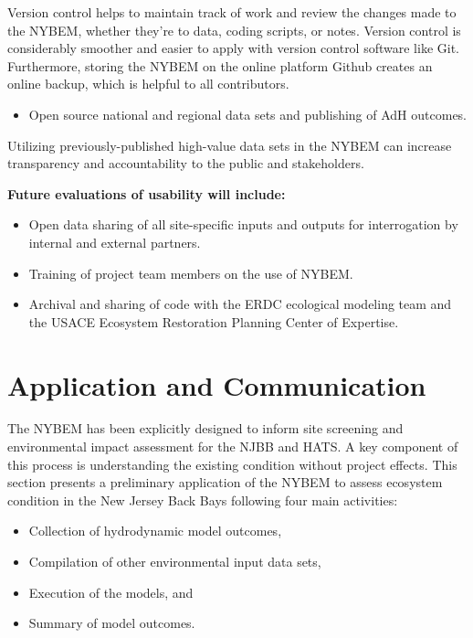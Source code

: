 \documentclass[
]{book}
\providecommand{\tightlist}{%
  \setlength{\itemsep}{0pt}\setlength{\parskip}{0pt}}
\begin{document}
Version control helps to maintain track of work and review the changes made to the NYBEM, whether they're to data, coding scripts, or notes. Version control is considerably smoother and easier to apply with version control software like Git. Furthermore, storing the NYBEM on the online platform Github creates an online backup, which is helpful to all contributors.

\begin{itemize}
\tightlist
\item
  Open source national and regional data sets and publishing of AdH outcomes.
\end{itemize}

Utilizing previously-published high-value data sets in the NYBEM can increase transparency and accountability to the public and stakeholders.

\textbf{Future evaluations of usability will include:}

\begin{itemize}
\item
  Open data sharing of all site-specific inputs and outputs for interrogation by internal and external partners.
\item
  Training of project team members on the use of NYBEM.
\item
  Archival and sharing of code with the ERDC ecological modeling team and the USACE Ecosystem Restoration Planning Center of Expertise.
\end{itemize}

\hypertarget{application-and-communication}{%
\chapter{Application and Communication}\label{application-and-communication}}

The NYBEM has been explicitly designed to inform site screening and environmental impact assessment for the NJBB and HATS. A key component of this process is understanding the existing condition without project effects. This section presents a preliminary application of the NYBEM to assess ecosystem condition in the New Jersey Back Bays following four main activities:

\begin{itemize}
\tightlist
\item
  Collection of hydrodynamic model outcomes,\\
\item
  Compilation of other environmental input data sets,\\
\item
  Execution of the models, and\\
\item
  Summary of model outcomes.
\end{itemize}
\end{document}

